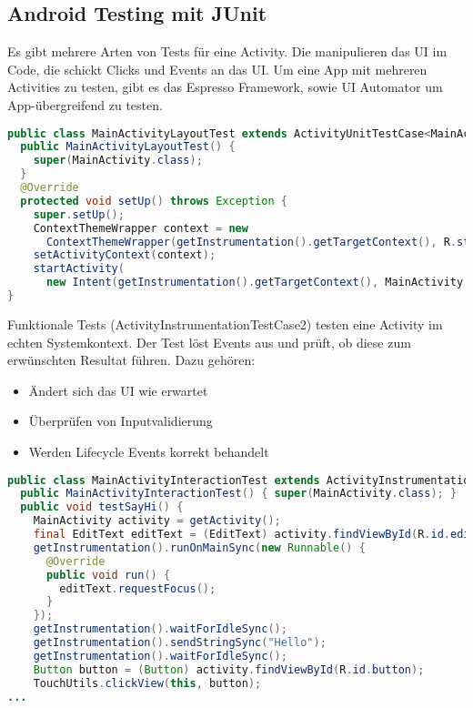 \subsection{Android Testing mit JUnit}
Es gibt mehrere Arten von Tests für eine Activity. Die  manipulieren das UI im Code, die  schickt Clicks und Events an das UI. Um eine App mit mehreren Activities zu testen, gibt es das Espresso Framework, sowie UI Automator um App-übergreifend zu testen.
\begin{lstlisting}[language=java]
public class MainActivityLayoutTest extends ActivityUnitTestCase<MainActivity> {
  public MainActivityLayoutTest() {
    super(MainActivity.class);
  }
  @Override
  protected void setUp() throws Exception {
    super.setUp();
    ContextThemeWrapper context = new
      ContextThemeWrapper(getInstrumentation().getTargetContext(), R.style.AppTheme);
    setActivityContext(context);
    startActivity(
      new Intent(getInstrumentation().getTargetContext(), MainActivity.class),null,null);
}
\end{lstlisting}
Funktionale Tests (ActivityInstrumentationTestCase2) testen eine Activity im echten Systemkontext. Der Test löst Events aus und prüft, ob diese zum erwünschten Resultat führen. Dazu gehören: 
\begin{itemize}
\item Ändert sich das UI wie erwartet
\item Überprüfen von Inputvalidierung
\item Werden Lifecycle Events korrekt behandelt
\end{itemize}
\begin{lstlisting}[language=java]
public class MainActivityInteractionTest extends ActivityInstrumentationTestCase2<MainActivity> {
  public MainActivityInteractionTest() { super(MainActivity.class); }
  public void testSayHi() {
    MainActivity activity = getActivity();
    final EditText editText = (EditText) activity.findViewById(R.id.editText);
    getInstrumentation().runOnMainSync(new Runnable() {
      @Override
      public void run() {
        editText.requestFocus();
      }
    });
    getInstrumentation().waitForIdleSync();
    getInstrumentation().sendStringSync("Hello");
    getInstrumentation().waitForIdleSync();
    Button button = (Button) activity.findViewById(R.id.button);
    TouchUtils.clickView(this, button);
...
\end{lstlisting}
